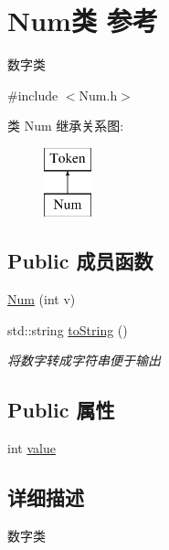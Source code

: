 \hypertarget{class_num}{}\section{Num类 参考}
\label{class_num}


数字类  




{\ttfamily \#include $<$Num.\+h$>$}

类 Num 继承关系图\+:\begin{figure}[H]
\begin{center}
\leavevmode
\includegraphics[height=2.000000cm]{class_num}
\end{center}
\end{figure}
\subsection*{Public 成员函数}
\begin{DoxyCompactItemize}
\item 
\hyperlink{class_num_afc0c5a6bc449547b300aa036e70eda2d}{Num} (int v)
\item 
std\+::string \hyperlink{class_num_aec8ab507b42f2080a8cc197f45f0c935}{to\+String} ()\hypertarget{class_num_aec8ab507b42f2080a8cc197f45f0c935}{}\label{class_num_aec8ab507b42f2080a8cc197f45f0c935}

\begin{DoxyCompactList}\small\item\em 将数字转成字符串便于输出 \end{DoxyCompactList}\end{DoxyCompactItemize}
\subsection*{Public 属性}
\begin{DoxyCompactItemize}
\item 
int \hyperlink{class_num_a40cb04ca1ed295495a2e4b358b984fb8}{value}
\end{DoxyCompactItemize}


\subsection{详细描述}
数字类 

